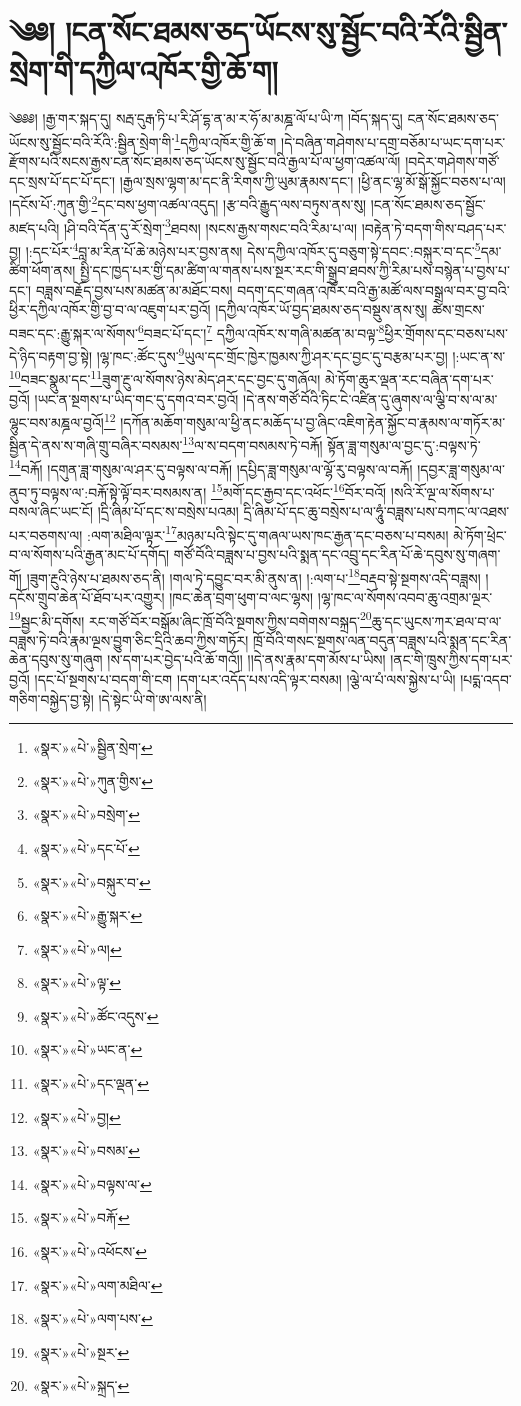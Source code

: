 \chapter{༄༅། །ངན་སོང་ཐམས་ཅད་ཡོངས་སུ་སྦྱོང་བའི་རོའི་སྦྱིན་སྲེག་གི་དཀྱིལ་འཁོར་གྱི་ཆོ་ག།}༄༅༅། །རྒྱ་གར་སྐད་དུ། སརྦ་དུརྒ་ཏི་པ་རི་ཤོ་དྷ་ན་མ་ར་ཧོ་མ་མཎྜ་ལོ་པ་ཡི་ཀ །བོད་སྐད་དུ། ངན་སོང་ཐམས་ཅད་ཡོངས་སུ་སྦྱོང་བའི་རོའི་:སྦྱིན་སྲེག་གི་\footnote{«སྣར་»«པེ་»སྦྱིན་སྲེག་}དཀྱིལ་འཁོར་གྱི་ཆོ་ག །དེ་བཞིན་གཤེགས་པ་དགྲ་བཅོམ་པ་ཡང་དག་པར་རྫོགས་པའི་སངས་རྒྱས་ངན་སོང་ཐམས་ཅད་ཡོངས་སུ་སྦྱོང་བའི་རྒྱལ་པོ་ལ་ཕྱག་འཚལ་ལོ། །བདེར་གཤེགས་གཙོ་དང་སྲས་པོ་དང་པོ་དང་། །རྒྱལ་སྲས་ལྷག་མ་དང་ནི་རིགས་ཀྱི་ཡུམ་རྣམས་དང་། །ཕྱི་ནང་ལྷ་མོ་སྒོ་སྐྱོང་བཅས་པ་ལ། །དངོས་པོ་:ཀུན་གྱི་\footnote{«སྣར་»«པེ་»ཀུན་གྱིས་}དང་བས་ཕྱག་འཚལ་འདུད། །རྩ་བའི་རྒྱུད་ལས་བཏུས་ནས་སུ། །ངན་སོང་ཐམས་ཅད་སྦྱོང་མཛད་པའི། །ཤི་བའི་དོན་དུ་རོ་སྲེག་\footnote{«སྣར་»«པེ་»བསྲེག་}ཐབས། །སངས་རྒྱས་གསང་བའི་རིམ་པ་ལ། །བརྟེན་ཏེ་བདག་གིས་བཤད་པར་བྱ། །:དང་པོར་\footnote{«སྣར་»«པེ་»དང་པོ་}བླ་མ་རིན་པོ་ཆེ་མཉེས་པར་བྱས་ནས། དེས་དཀྱིལ་འཁོར་དུ་བཅུག་སྟེ་དབང་:བསྐུར་བ་དང་\footnote{«སྣར་»«པེ་»བསྐུར་བ་}དམ་ཚིག་ཕོག་ནས། སྤྱི་དང་ཁྱད་པར་གྱི་དམ་ཚིག་ལ་གནས་པས་སྔར་རང་གི་སྒྲུབ་ཐབས་ཀྱི་རིམ་པས་བསྙེན་པ་བྱས་པ་དང་། བཟླས་བརྗོད་བྱས་པས་མཚན་མ་མཐོང་བས། བདག་དང་གཞན་འཁོར་བའི་རྒྱ་མཚོ་ལས་བསྒྲལ་བར་བྱ་བའི་ཕྱིར་དཀྱིལ་འཁོར་གྱི་བྱ་བ་ལ་འཇུག་པར་བྱའོ། །དཀྱིལ་འཁོར་ཡོ་བྱད་ཐམས་ཅད་བསྡུས་ནས་སུ། ཚེས་གྲངས་བཟང་དང་:རྒྱུ་སྐར་ལ་སོགས་\footnote{«སྣར་»«པེ་»རྒྱུ་སྐར་}བཟང་པོ་དང་།\footnote{«སྣར་»«པེ་»ལ།} དཀྱིལ་འཁོར་ས་གཞི་མཚན་མ་བལྟ་\footnote{«སྣར་»«པེ་»ལྟ་}ཕྱིར་གྲོགས་དང་བཅས་པས་དེ་ཉིད་བརྟག་བྱ་སྟེ། །ལྷ་ཁང་:ཚོང་དུས་\footnote{«སྣར་»«པེ་»ཚོང་འདུས་}ཡུལ་དང་གྲོང་ཁྱེར་ཁྱམས་ཀྱི་ཤར་དང་བྱང་དུ་བརྩམ་པར་བྱ། །:ཡང་ན་ས་\footnote{«སྣར་»«པེ་»ཡང་ན་}བཟང་སྣུམ་དང་\footnote{«སྣར་»«པེ་»དང་ལྡན་}ཟུག་རྔུ་ལ་སོགས་ཉེས་མེད་ཤར་དང་བྱང་དུ་གཞོལ། མེ་ཏོག་ཆུར་ལྡན་རང་བཞིན་དག་པར་བྱའོ། །ཡང་ན་སྔགས་པ་ཡིད་གང་དུ་དགའ་བར་བྱའོ། །དེ་ནས་གཙོ་བོའི་ཏིང་ངེ་འཛིན་དུ་ཞུགས་ལ་ལྕི་བ་ས་ལ་མ་ལྷུང་བས་མཎྜལ་བྱའོ།\footnote{«སྣར་»«པེ་»བྱ།} །དཀོན་མཆོག་གསུམ་ལ་ཕྱི་ནང་མཆོད་པ་བྱ་ཞིང་འཇིག་རྟེན་སྐྱོང་བ་རྣམས་ལ་གཏོར་མ་སྦྱིན་དེ་ནས་ས་གཞི་གྲུ་བཞིར་བསམས་\footnote{«སྣར་»«པེ་»བསམ་}ལ་ས་བདག་བསམས་ཏེ་བརྐོ། སྟོན་ཟླ་གསུམ་ལ་བྱང་དུ་:བལྟས་ཏེ་\footnote{«སྣར་»«པེ་»བལྟས་ལ་}བརྐོ། །དགུན་ཟླ་གསུམ་ལ་ཤར་དུ་བལྟས་ལ་བརྐོ། །དཔྱིད་ཟླ་གསུམ་ལ་ལྷོ་རུ་བལྟས་ལ་བརྐོ། །དབྱར་ཟླ་གསུམ་ལ་ནུབ་ཏུ་བལྟས་ལ་:བརྐོ་སྟེ་ལྟོ་བར་བསམས་ན། \footnote{«སྣར་»«པེ་»བརྐོ་}མགོ་དང་རྒྱབ་དང་འཕོང་\footnote{«སྣར་»«པེ་»འཕོངས་}བོར་བའོ། །སའི་རོ་ལྔ་ལ་སོགས་པ་བསལ་ཞིང་ཡང་ངོ། །དྲི་ཞིམ་པོ་དང་ས་བསྲེས་པའམ། དྲི་ཞིམ་པོ་དང་ཆུ་བསྲེས་པ་ལ་ཧཱུཾ་བཟླས་པས་བཀང་ལ་འཐས་པར་བཅགས་ལ། :ལག་མཐིལ་ལྟར་\footnote{«སྣར་»«པེ་»ལག་མཐིལ་}མཉམ་པའི་སྟེང་དུ་གཞལ་ཡས་ཁང་རྒྱན་དང་བཅས་པ་བསམ། མེ་ཏོག་ཕྲེང་བ་ལ་སོགས་པའི་རྒྱན་མང་པོ་དགོད། གཙོ་བོའི་བཟླས་པ་བྱས་པའི་སྨན་དང་འབྲུ་དང་རིན་པོ་ཆེ་དབུས་སུ་གཞག་གོ། །ཟུག་རྔུའི་ཉེས་པ་ཐམས་ཅད་ནི། །གལ་ཏེ་དབྱུང་བར་མི་ནུས་ན། །:ལག་པ་\footnote{«སྣར་»«པེ་»ལག་པས་}བརྡབ་སྟེ་སྔགས་འདི་བཟླས། །དངོས་གྲུབ་ཆེན་པོ་ཐོབ་པར་འགྱུར། །ཁང་ཆེན་བྲག་ཕུག་བ་ལང་ལྷས། །ལྷ་ཁང་ལ་སོགས་འབབ་ཆུ་འགྲམ་ལྔར་\footnote{«སྣར་»«པེ་»སྔར་}སྦྱང་མི་དགོས། རང་གཙོ་བོར་བསྒོམ་ཞིང་ཁྲོ་བོའི་སྔགས་ཀྱིས་བགེགས་བསྐྲད་\footnote{«སྣར་»«པེ་»སྐྲད་}ཆུ་དང་ཡུངས་ཀར་ཐལ་བ་ལ་བཟླས་ཏེ་བའི་རྣམ་ལྔས་བྱུག་ཅིང་དྲིའི་ཆབ་ཀྱིས་གཏོར། ཁྲོ་བོའི་གསང་སྔགས་ལན་བདུན་བཟླས་པའི་སྨན་དང་རིན་ཆེན་དབུས་སུ་གཞུག །ས་དག་པར་བྱེད་པའི་ཆོ་གའོ།། །།དེ་ནས་རྣམ་དག་མོས་པ་ཡིས། །ནང་གི་ཁྲུས་ཀྱིས་དག་པར་བྱའོ། །དང་པོ་སྔགས་པ་བདག་གི་ངག །དག་པར་འདོད་པས་འདི་ལྟར་བསམ། །ལྕེ་ལ་པཾ་ལས་སྐྱེས་པ་ཡི། །པདྨ་འདབ་གཅིག་བསྐྱེད་བྱ་སྟེ། །དེ་སྟེང་ཡི་གེ་ཨ་ལས་ནི། 